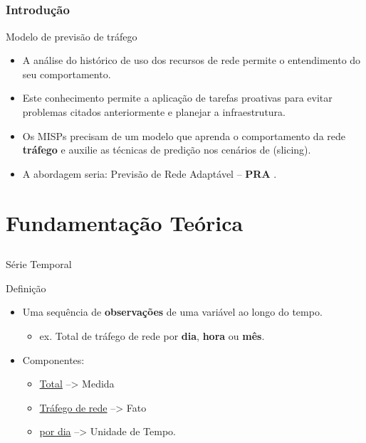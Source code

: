 \documentclass[aspectratio=169]{beamer}
\begin{document}

\subsection{}
\begin{frame}
\frametitle{Introdução}
\begin{block}{Modelo de previsão de tráfego}
    \begin{itemize}
    \item A análise do histórico de uso dos recursos de rede permite o entendimento do seu comportamento.
        \item Este conhecimento permite a aplicação de tarefas proativas para evitar problemas citados anteriormente e planejar a infraestrutura.
        \item Os MISPs precisam de um modelo que aprenda o comportamento da rede \textbf{tráfego} e auxilie as técnicas de predição nos cenários de (slicing).
        \item A abordagem seria: Previsão de Rede Adaptável -- \textbf{PRA} .
    \end{itemize}
\end{block}
\end{frame}


\section{Fundamentação Teórica}

\subsection{}
\begin{frame}{Série Temporal}
\begin{block}{Definição}

    \begin{itemize}
        \item Uma sequência de \textbf{observações} de uma variável ao longo do tempo.
        \begin{itemize}[triangle]
            \item ex. Total de tráfego de rede por \textbf{dia}, \textbf{hora} ou \textbf{mês}.
        \end{itemize}
        \item Componentes:
        \begin{itemize}[triangle]
            \item \underline{Total} --> Medida
            \item \underline{Tráfego de rede} --> Fato  \item \underline{por dia} --> Unidade de Tempo.
                 
        \end{itemize}
        \end{itemize}
    \end{block}  
\end{frame}
\end{document}
